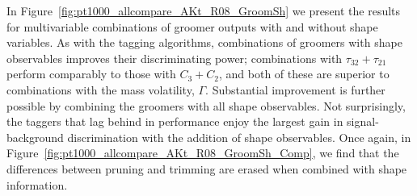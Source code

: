 In Figure~\ref{fig:pt1000_allcompare_AKt_R08_GroomSh} we present the results for multivariable combinations of groomer outputs with and without shape variables. As with the tagging algorithms, combinations of groomers with shape observables improves their discriminating power; combinations with $\tau_{32}+\tau_{21}$ perform comparably to those with $C_3+C_2$, and both of these are superior to combinations with the mass volatility, $\Gamma$. Substantial improvement is further possible by combining the groomers with all shape observables. Not surprisingly, the taggers that lag behind in performance enjoy the largest gain in signal-background discrimination with the addition of shape observables. Once again, in Figure~\ref{fig:pt1000_allcompare_AKt_R08_GroomSh_Comp}, we find that the differences between pruning and trimming are erased when combined with shape information.

